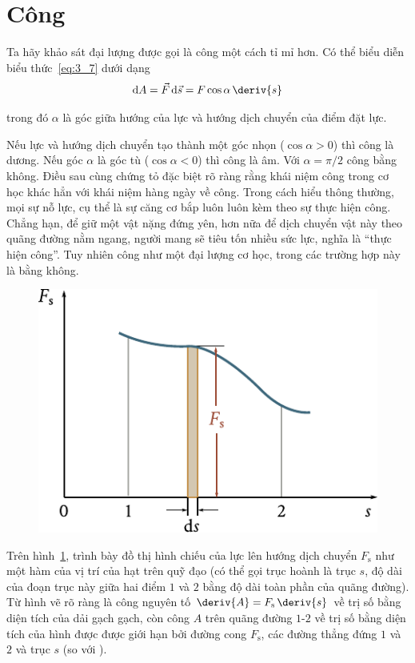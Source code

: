 \section{Công}\label{sec:3_3}

Ta hãy khảo sát đại lượng được gọi là công một cách tỉ mỉ hơn. Có thể biểu diễn biểu thức~\eqref{eq:3_7} dưới dạng
\begin{equation}\label{eq:3_12}
\mathrm{d}A = \vec{F}\,\mathrm{d}\vec{s} = F\cos\alpha\,\deriv{s}
\end{equation}

\noindent
trong đó $\alpha$ là góc giữa hướng của lực và hướng dịch chuyển của điểm đặt lực.

Nếu lực và hướng dịch chuyển tạo thành một góc nhọn  ($\cos\alpha>0$) thì công là dương. Nếu góc $\alpha$ là góc tù ($\cos\alpha<0$) thì công là âm. Với $\alpha=\pi/2$ công bằng không. Điều sau cùng chứng tỏ đặc biệt rõ ràng rằng khái niệm công trong cơ học khác hẳn với khái niệm hàng ngày về công. Trong cách hiểu thông thường, mọi sự nỗ lực, cụ thể là sự căng cơ bắp luôn luôn kèm theo sự thực hiện công. Chẳng hạn, để giữ một vật nặng đứng yên, hơn nữa để dịch chuyển vật này theo quãng đường nằm ngang, người mang sẽ tiêu tốn nhiều sức lực, nghĩa là ``thực hiện công''. Tuy nhiên công như một đại lượng cơ học, trong các trường hợp này là bằng không.

\begin{figure}[!htb]
	\begin{center}
		\includegraphics[scale=1]{figures/ch_03/fig_3_1.pdf}
		\caption[]{}
		\label{fig:3_1}
	\end{center}
\end{figure}

Trên hình~\ref{fig:3_1}, trình bày đồ thị hình chiếu  của lực lên hướng dịch chuyển $F_{\text{s}}$ như một hàm của vị trí của hạt trên quỹ đạo (có thể gọi trục hoành là trục $s$, độ dài của đoạn trục này giữa hai điểm $1$ và $2$ bằng độ dài toàn phần của quãng đường). Từ hình vẽ rõ ràng là công nguyên tố $\deriv{A}=F_{\text{s}}\,\deriv{s}$ về trị số bằng diện tích của dải gạch gạch, còn công $A$ trên quãng đường $1$-$2$ về trị số bằng diện tích của hình được được giới hạn bởi đường cong $F_{\text{s}}$, các đường thẳng đứng $1$ và $2$ và trục $s$ (so với ).

